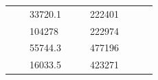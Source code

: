\begin{table}[]
\begin{tabular}{|cclccllll}
\multicolumn{1}{|c|}{\cellcolor[HTML]{FFFFC7}}                                & \multicolumn{1}{c|}{\cellcolor[HTML]{DAE8FC}}                      & \multicolumn{1}{l|}{\cellcolor[HTML]{DAE8FC}33720.1}   & \multicolumn{1}{c|}{\cellcolor[HTML]{FFFFC7}}                                & \multicolumn{1}{c|}{\cellcolor[HTML]{DAE8FC}}                       & \multicolumn{1}{l|}{\cellcolor[HTML]{DDFDFF}222401}    &                                                                              &                                                                    &                                                        \\ \cline{3-3} \cline{6-6}
\multicolumn{1}{|c|}{\cellcolor[HTML]{FFFFC7}}                                & \multicolumn{1}{c|}{\cellcolor[HTML]{DAE8FC}}                      & \multicolumn{1}{l|}{\cellcolor[HTML]{DDFDFF}104278}    & \multicolumn{1}{c|}{\cellcolor[HTML]{FFFFC7}}                                & \multicolumn{1}{c|}{\cellcolor[HTML]{DAE8FC}}                       & \multicolumn{1}{l|}{\cellcolor[HTML]{DAE8FC}222974}    &                                                                              &                                                                    &                                                        \\ \cline{3-3} \cline{6-6}
\multicolumn{1}{|c|}{\cellcolor[HTML]{FFFFC7}}                                & \multicolumn{1}{c|}{\cellcolor[HTML]{DAE8FC}}                      & \multicolumn{1}{l|}{\cellcolor[HTML]{DAE8FC}55744.3}   & \multicolumn{1}{c|}{\cellcolor[HTML]{FFFFC7}}                                & \multicolumn{1}{c|}{\cellcolor[HTML]{DAE8FC}}                       & \multicolumn{1}{l|}{\cellcolor[HTML]{DDFDFF}477196}    &                                                                              &                                                                    &                                                        \\ \cline{3-3} \cline{6-6}
\multicolumn{1}{|c|}{\cellcolor[HTML]{FFFFC7}}                                & \multicolumn{1}{c|}{\cellcolor[HTML]{DAE8FC}}                      & \multicolumn{1}{l|}{\cellcolor[HTML]{DDFDFF}16033.5}   & \multicolumn{1}{c|}{\cellcolor[HTML]{FFFFC7}}                                & \multicolumn{1}{c|}{\cellcolor[HTML]{DAE8FC}}                       & \multicolumn{1}{l|}{\cellcolor[HTML]{DAE8FC}423271}    &                                                                              &                                                                    &                                                        \\ \cline{3-3} \cline{6-6}

\end{tabular}
\end{table}
